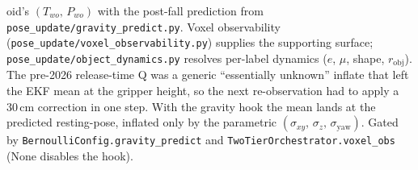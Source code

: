 \documentclass[11pt]{article}
\newcommand{\code}[1]{\texttt{\small #1}}
\begin{document}
\begin{enumerate}[leftmargin=2em,itemsep=0pt,topsep=2pt]
   oid's $(T_{wo},\,P_{wo})$ with the post-fall prediction from
   \code{pose\_update/gravity\_predict.py}. Voxel observability
   (\code{pose\_update/voxel\_observability.py}) supplies the supporting
   surface; \code{pose\_update/object\_dynamics.py} resolves
   per-label dynamics ($e$, $\mu$, shape, $r_{\text{obj}}$). The
   pre-2026 release-time Q was a generic ``essentially unknown''
   inflate that left the EKF mean at the gripper height, so the next
   re-observation had to apply a 30\,cm correction in one step. With
   the gravity hook the mean lands at the predicted resting-pose,
   inflated only by the parametric $(\sigma_{xy},\,\sigma_z,\,\sigma_{\text{yaw}})$.
   Gated by \code{BernoulliConfig.gravity\_predict} and
   \code{TwoTierOrchestrator.voxel\_obs} (None disables the hook).
\end{enumerate}
\end{document}
